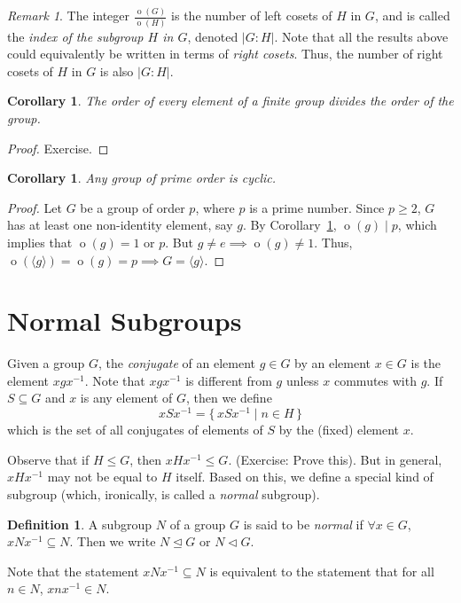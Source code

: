 \documentclass[svgnames]{article}
\newtheorem{Corollary}[Theorem]{Corollary}
\theoremstyle{definition}
\newtheorem{Definition}[Theorem]{Definition}
\theoremstyle{remark}
\newtheorem*{Remark*}{Remark}
\DeclareMathOperator{\ord}{o}
\begin{document}
\begin{Remark*}\label{def:SubgroupIndex}
The integer $\frac{\ord(G)}{\ord(H)}$ is the number of left cosets of $H$ in $G$, and is called the \emph{index of the subgroup $H$ in $G$}, denoted $|G : H|$. Note that all the results above could equivalently be written in terms of \emph{right cosets}. Thus, the number of right cosets of $H$ in $G$ is also $|G : H|$.
\end{Remark*}

\begin{Corollary}\label{cor:OrderElem}
The order of every element of a finite group divides the order of the group.
\end{Corollary}
\begin{proof}
Exercise.
\end{proof}

\begin{Corollary}\label{cor:Prime=>Cyc}
Any group of prime order is cyclic.
\end{Corollary}
\begin{proof}
Let $G$ be a group of order $p$, where $p$ is a prime number. Since $p \ge 2$, $G$ has at least one non-identity element, say $g$. By Corollary~\ref{cor:OrderElem}, $\ord(g) \mid p$, which implies that $\ord(g) = 1$ or $p$. But $g \ne e \implies \ord(g) \ne 1$. Thus, $\ord(\langle g \rangle) = \ord(g) = p \implies G = \langle g \rangle$.
\end{proof}

\section{Normal Subgroups}\label{sec:NormSubs}
Given a group $G$, the \emph{conjugate} of an element $g \in G$ by an element $x \in G$ is the element $xgx^{-1}$. Note that $xgx^{-1}$ is different from $g$ unless $x$ commutes with $g$. If $S \subseteq G$ and $x$ is any element of $G$, then we define
\begin{equation*}
xSx^{-1} = \{\, xSx^{-1} \mid n \in H \,\}
\end{equation*}
which is the set of all conjugates of elements of $S$ by the (fixed) element $x$.

Observe that if $H \le G$, then $xHx^{-1} \le G$. {\small (Exercise: Prove this)}. But in general, $xHx^{-1}$ may not be equal to $H$ itself. Based on this, we define a special kind of subgroup (which, ironically, is called a \emph{normal} subgroup).

\begin{Definition}\label{def:NormSubgroup}
A subgroup $N$ of a group $G$ is said to be \emph{normal} if $\forall x \in G$, $xNx^{-1} \subseteq N$. Then we write $N \unlhd G$ or $N \lhd G$.
\end{Definition}
Note that the statement $xNx^{-1} \subseteq N$ is equivalent to the statement that for all $n \in N$, $xnx^{-1} \in N$.
\end{document}
